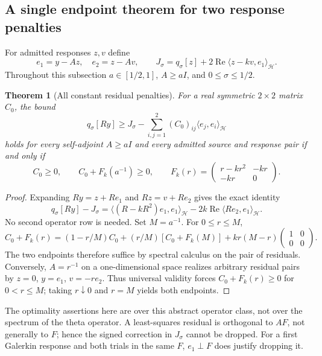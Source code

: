 \documentclass[11pt,a4paper]{article}
\numberwithin{equation}{section}
\newtheorem{theorem}{Theorem}[section]
\theoremstyle{definition}\newtheorem{definition}[theorem]{Definition}
\theoremstyle{remark}\newtheorem{remark}[theorem]{Remark}
\newcommand{\Hh}{\mathcal H}\newcommand{\Hw}{\mathcal H}
\newcommand{\ip}[2]{\langle#1,#2\rangle}\newcommand{\norm}[1]{\lVert#1\rVert}\newcommand{\abs}[1]{\lvert#1\rvert}
\begin{document}
\subsection{A single endpoint theorem for two response penalties}\label{rtc:sec:penalties}
For admitted responses $z,v$ define
\begin{equation}\label{rtc:eq:two-base}
 e_1=y-Az,\quad e_2=z-Av,\qquad
 J_\sigma=q_\sigma[z]+2\operatorname{Re}\ip{z-kv}{e_1}_{\Hh}.
\end{equation}
Throughout this subsection $a\in[1/2,1]$, $A\ge aI$, and
$0\le\sigma\le1/2$.
\begin{theorem}[All constant residual penalties]\label{rtc:thm:endpoint}
For a real symmetric $2\times2$ matrix $C_0$, the bound
\begin{equation}\label{rtc:eq:general-penalty}
 q_\sigma[Ry]\ge J_\sigma-
 \sum_{i,j=1}^2(C_0)_{ij}\ip{e_j}{e_i}_{\Hh}
\end{equation}
holds for every self-adjoint $A\ge aI$ and every admitted source and
response pair if and only if
\begin{equation}\label{rtc:eq:endpoints}
 C_0\ge0,\qquad C_0+F_k(a^{-1})\ge0,\qquad
 F_k(r)=\begin{pmatrix}r-kr^2&-kr\\-kr&0\end{pmatrix}.
\end{equation}
\end{theorem}
\begin{proof}
Expanding $Ry=z+Re_1$ and $Rz=v+Re_2$ gives the exact identity
\begin{equation}\label{rtc:eq:signed-remainder}
 q_\sigma[Ry]-J_\sigma
 =\ip{(R-kR^2)e_1}{e_1}_{\Hh}
       -2k\operatorname{Re}\ip{Re_2}{e_1}_{\Hh}.
\end{equation}
No second operator row is needed. Set $M=a^{-1}$. For $0\le r\le M$,
\[
 C_0+F_k(r)=(1-r/M)C_0+(r/M)[C_0+F_k(M)]
                  +kr(M-r)\begin{pmatrix}1&0\\0&0\end{pmatrix}.
\]
The two endpoints therefore suffice by spectral calculus on the pair of
residuals. Conversely, $A=r^{-1}$ on a one-dimensional space realizes
arbitrary residual pairs by $z=0$, $y=e_1$, $v=-re_2$.
Thus universal validity forces $C_0+F_k(r)\ge0$ for $0<r\le M$;
taking $r\downarrow0$ and $r=M$ yields both endpoints.
\end{proof}
The optimality assertions here are over this abstract operator class, not
over the spectrum of the theta operator. A least-squares residual is
orthogonal to $AF$, not generally to $F$; hence the signed correction in
$J_\sigma$ cannot be dropped. For a first Galerkin response and both trials
in the same $F$, $e_1\perp F$ does justify dropping it.
\end{document}
